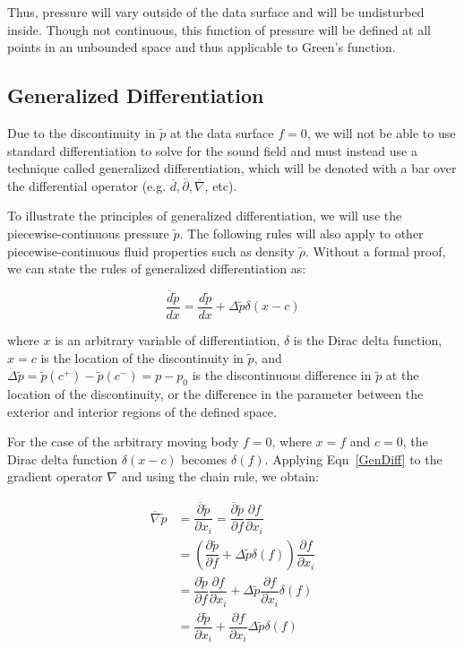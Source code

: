 \documentclass[]{aiaa-tc}%
\begin{document}
\noindent Thus, pressure will vary outside of the data surface and will be undisturbed inside. Though not continuous, this function of pressure will be defined at all points in an unbounded space and thus applicable to Green's function.




\subsection{Generalized Differentiation}

Due to the discontinuity in $\widetilde{p}$ at the data surface $f=0$, we will not be able to use standard differentiation to solve for the sound field and must instead use a technique called generalized differentiation, which will be denoted with a bar over the differential operator (e.g. $\overline{d}, \overline{\partial}, \overline{\nabla}$, etc).

To illustrate the principles of generalized differentiation, we will use the piecewise-continuous pressure $\widetilde{p}$.  The following rules will also apply to other piecewise-continuous fluid properties such as density $\widetilde{\rho}$. Without a formal proof, we can state the rules of generalized differentiation as:

\begin{equation} \label{GenDiff}
\dfrac{\overline{d}\widetilde{p}}{dx}
    = \dfrac{d\widetilde{p}}{dx} + \Delta\widetilde{p} \delta(x - c)
\end{equation}

\noindent where $x$ is an arbitrary variable of differentiation, $\delta$ is the Dirac delta function, $x=c$ is the location of the discontinuity in $\widetilde{p}$, and $\Delta\widetilde{p}=\widetilde{p}(c^+)-\widetilde{p}(c^-)=p - p_0$ is the discontinuous difference in $\widetilde{p}$ at the location of the discontinuity, or the difference in the parameter between the exterior and interior regions of the defined space.

For the case of the arbitrary moving body $f=0$, where $x=f$ and $c=0$, the Dirac delta function $\delta(x-c)$ becomes $\delta(f)$.  Applying Eqn~\ref{GenDiff} to the gradient operator $\nabla$ and using the chain rule, we obtain:

\begin{align*}
\overline{\nabla} \widetilde{p}
&= \dfrac{\overline{\partial}\widetilde{p}}{\partial x_i}
= \dfrac{\overline{\partial}\widetilde{p}}{\partial f}
    \dfrac{\partial f}{\partial x_i} \\
&= \left( \dfrac{\partial\widetilde{p}}{\partial f}
    + \Delta \widetilde{p} \delta(f) \right)
    \dfrac{\partial f}{\partial x_i} \\
&= \dfrac{\partial\widetilde{p}}{\partial f} \dfrac{\partial f}{\partial x_i}
    + \Delta \widetilde{p} \dfrac{\partial f}{\partial x_i} \delta(f) \\
&= \dfrac{\partial\widetilde{p}}{\partial x_i}
    + \dfrac{\partial f}{\partial x_i} \Delta \widetilde{p} \delta(f)
\end{align*}
\end{document}
